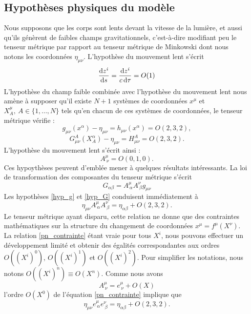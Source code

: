 		\subsection{Hypothèses physiques du modèle}
			Nous supposons que les corps sont lents devant la vitesse de la lumière, et aussi qu'ils génèrent de faibles champs gravitationnels, c'est-à-dire modifiant peu le tenseur métrique par rapport au tenseur métrique de Minkowski dont nous notons les coordonnées $\eta_{\mu\nu}$.
			L'hypothèse du mouvement lent s'écrit
			\begin{equation}
				\frac{\mathrm{d} z^i}{\mathrm{d} s} = \frac{\mathrm{d} z^i}{c \, \mathrm{d} \tau} = O(1)
			\end{equation}
			L'hypothèse du champ faible combinée avec l'hypothèse du mouvement lent nous amène à supposer qu'il existe $N+1$ systèmes de coordonnées $x^\mu$ et $X^\mu_A,\ A\in\{1,\ldots,N\}$ tels qu'en chacun de ces systèmes de coordonnées, le tenseur métrique vérifie :
			\begin{equation}\label{hyp_g}
				g_{\mu\nu}(x^\alpha)-\eta_{\mu\nu}=h_{\mu\nu}(x^\alpha)=O(2,3,2),
			\end{equation}
			\begin{equation}\label{hyp_G}
				G^A_{\mu\nu}(X^\alpha_A)-\eta_{\mu\nu}=H^A_{\mu\nu}=O(2,3,2).
			\end{equation}
			L'hypothèse du mouvement lent s'écrit ainsi :
			\begin{equation}
				A^\mu_{\ \nu}=O(0,1,0). \label{hyp_v}
			\end{equation}
			Ces hypoythèses peuvent d'emblée mener à quelques résultats intéressants. La loi de transformation des composantes du tenseur métrique s'écrit
			\begin{equation}
				G_{\alpha\beta}=A^\mu_{\ \alpha}A^\nu_{\ \beta}g_{\mu\nu}
			\end{equation}
			Les hypothèses \ref{hyp_g} et \ref{hyp_G} conduisent immédiatement à 
			\begin{equation}\label{pn_contrainte}
				\eta_{\mu\nu}A^\mu_{\ \alpha}A^\nu_{\ \beta} = \eta_{\alpha\beta}+O(2,3,2).
			\end{equation}
			Le tenseur métrique ayant disparu, cette relation ne donne que des contraintes mathématiques sur la structure du changement de coordonnées $x^\mu=f^\mu(X^\nu)$. La relation \ref{pn_contrainte} étant vraie pour tous $X^i$, nous pouvons effectuer un développement limité et obtenir des égalités correspondantes aux ordres $O((X^i)^0)$, $O((X^i)^1)$ et $O((X^i)^2)$. Pour simplifier les notations, nous notons $O((X^i)^n)\equiv O(X^n)$. Comme nous avons 
			\begin{equation}
				A^\mu_{\ \nu}=e^\mu_{\ \nu}+O(X) 	
			\end{equation}
			l'ordre $O(X^0)$ de l'équation \ref{pn_contrainte} implique que
			\begin{equation}\label{o_z_pn_a}
				\eta_{\mu\nu}e^\mu_{\ \alpha}e^\nu_{\ \beta}=\eta_{\alpha\beta}+O(2,3,2).
			\end{equation}

